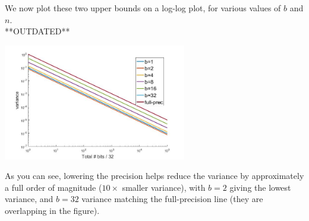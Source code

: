 \documentclass[12pt]{article}
\begin{document}
We now plot these two upper bounds on a log-log plot, for various values of $b$ and $n$.\\
**OUTDATED**
\begin{center}
	\includegraphics[width=0.6\textwidth]{lprff_variance_figure.jpg}
\end{center}
As you can see, lowering the precision helps reduce the variance by approximately a full order of magnitude ($10\times$ smaller variance), with $b=2$ giving the lowest variance, and $b=32$ variance matching the full-precision line (they are overlapping in the figure).
\end{document}
